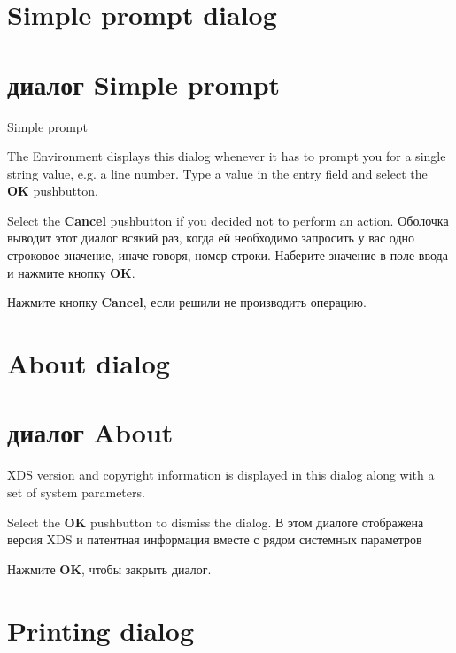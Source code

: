 \ifenglish
\section{Simple prompt dialog}
\else
\section{диалог Simple prompt}
\fi
{}

\begin{popup}
\caption{Simple prompt}

\ifenglish
The Environment displays this dialog whenever it has to prompt you for
a single string value, e.g. a line number. Type a value in the entry field
and select the {\bf OK} pushbutton.

Select the {\bf Cancel} pushbutton if you decided not to perform an action.
\else
Оболочка выводит этот диалог всякий раз, когда ей необходимо запросить
у вас одно строковое значение, иначе говоря, номер строки. Наберите значение в
поле ввода и нажмите кнопку {\bf OK}.

Нажмите кнопку {\bf Cancel}, если решили не производить операцию.
\fi
\end{popup}


\ifenglish
\section{About dialog}
\else
\section{диалог About}
\fi
{}

\ifenglish
XDS version and copyright information is displayed in this dialog
along with a set of system parameters.

Select the {\bf OK} pushbutton to dismiss the dialog.
\else
В этом диалоге отображена версия XDS и патентная информация вместе с рядом
системных параметров

Нажмите {\bf OK}, чтобы закрыть диалог. 
\fi

\ifenglish
\section{Printing dialog}
\else

